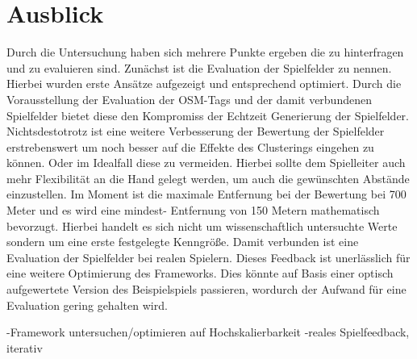 \section*{Ausblick}

Durch die Untersuchung haben sich mehrere Punkte ergeben die zu hinterfragen und zu evaluieren sind. Zunächst ist die Evaluation der Spielfelder zu nennen. Hierbei wurden erste Ansätze aufgezeigt und entsprechend optimiert. Durch die Vorausstellung der Evaluation der OSM-Tags und der damit verbundenen Spielfelder bietet diese den Kompromiss der Echtzeit Generierung der Spielfelder. Nichtsdestotrotz ist eine weitere Verbesserung der Bewertung der Spielfelder erstrebenswert um noch besser auf die Effekte des Clusterings eingehen zu können. Oder im Idealfall diese zu vermeiden. Hierbei sollte dem Spielleiter auch mehr Flexibilität an die Hand gelegt werden, um auch die gewünschten Abstände einzustellen. Im Moment ist die maximale Entfernung bei der Bewertung bei 700 Meter und es wird eine mindest- Entfernung von 150 Metern  mathematisch bevorzugt. Hierbei handelt es sich nicht um wissenschaftlich untersuchte Werte sondern um eine erste festgelegte Kenngröße.
Damit verbunden ist eine Evaluation der Spielfelder bei realen Spielern. Dieses Feedback ist unerlässlich für eine weitere Optimierung des Frameworks. Dies könnte auf Basis einer optisch aufgewertete Version des Beispielspiels passieren, wordurch der Aufwand für eine Evaluation gering gehalten wird.

-Framework untersuchen/optimieren auf Hochskalierbarkeit
-reales Spielfeedback, iterativ